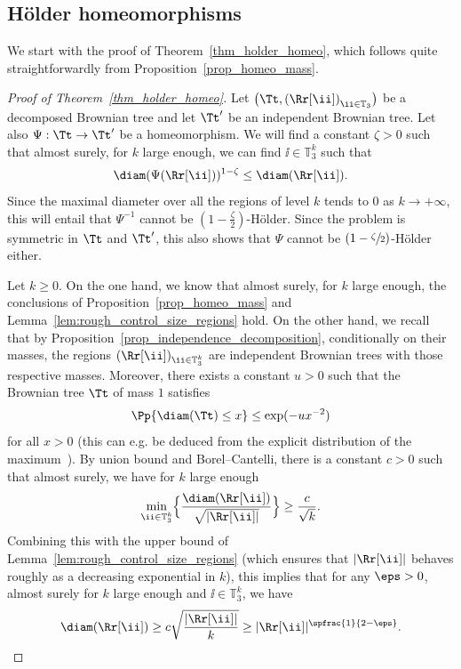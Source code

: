 \subsection{Hölder homeomorphisms}
We start with the proof of Theorem~\ref{thm_holder_homeo}, which follows quite straightforwardly from Proposition~\ref{prop_homeo_mass}.
\begin{proof}[Proof of Theorem~\ref{thm_holder_homeo}]
Let $\left( \Tt, \left( \Rr[\ii] \right)_{\ii \in \mathbb{T}_3} \right)$ be a decomposed Brownian tree and let $\Tt'$ be an independent Brownian tree. Let also $\Psi:\Tt\rightarrow\Tt'$ be a homeomorphism. We will find a constant $\zeta>0$ such that almost surely, for $k$ large enough, we can find $\ii \in \mathbb{T}_3^k$ such that
\begin{align}
\diam(\Psi(\Rr[\ii ]))^{1-\zeta}\leq \diam(\Rr[\ii ]).
\end{align}
Since the maximal diameter over all the regions of level $k$ tends to $0$ as $k \to +\infty$, this will entail that $\Psi^{-1}$ cannot be $(1-\frac{\zeta}{2})$-Hölder.
Since the problem is symmetric in $\Tt$ and $\Tt'$, this also shows that $\Psi$ cannot be $(1-\sfrac{\zeta}{2})$-Hölder either.

Let $k \geq 0$. On the one hand, we know that almost surely, for $k$ large enough, the conclusions of Proposition~\ref{prop_homeo_mass} and Lemma~\ref{lem:rough_control_size_regions} hold. On the other hand, we recall that by Proposition~\ref{prop_independence_decomposition}, conditionally on their masses, the regions $(\Rr[\ii ])_{\ii \in
\mathbb{T}_3^k}$ are independent Brownian trees with those respective masses.
Moreover, there exists a constant $u>0$ such that the Brownian tree $\Tt$ of mass $1$ satisfies
\[\Pp{\diam(\Tt)\leq x} \leq \exp(-ux^{-2})\]
for all $x>0$ (this can e.g. be deduced from the explicit distribution of the maximum~\cite{kennedy_distribution_1976}). By union bound and Borel--Cantelli, there is a constant $c>0$ such that almost surely, we have for $k$ large enough
\begin{align*}
\min_{\ii \in \mathbb{T}_3^k} \Bigl\lbrace\frac{\diam (\Rr[\ii ])}{\sqrt{|\Rr[\ii ]|}} \Bigr\rbrace \geq \frac{c}{\sqrt{k}}.
\end{align*}
Combining this with the upper bound of Lemma~\ref{lem:rough_control_size_regions} (which ensures that $|\Rr[\ii]|$ behaves roughly as a decreasing exponential in $k$),
this implies that for any $\eps>0$, almost surely for $k$ large enough and $\ii \in \mathbb{T}_3^k$, we have
\begin{equation}\label{eq:diam is at least mass to the half minus epsilon}
\diam (\Rr[\ii ]) \geq c \sqrt{\frac{|\Rr[\ii ]|}{k}} \geq |\Rr[\ii ]|^{\spfrac{1}{2-\eps}}.
\end{equation}


\end{proof}
